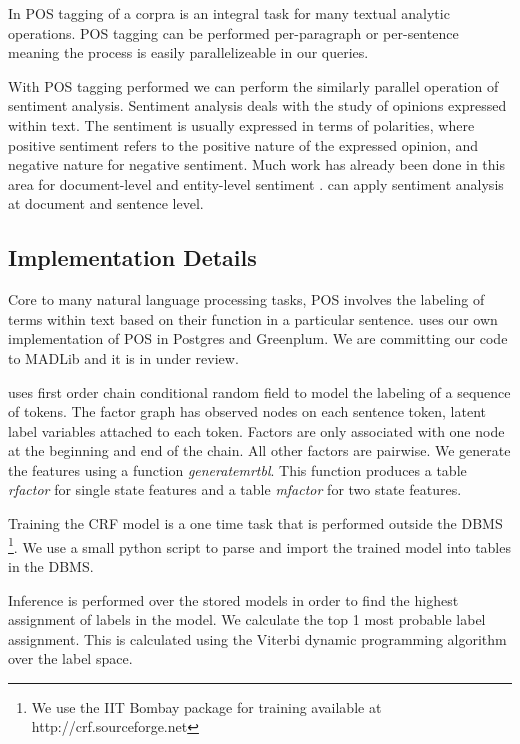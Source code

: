 In POS tagging of a corpra is an integral task for many 
textual analytic operations. POS tagging can be performed per-paragraph or 
per-sentence meaning the process is easily parallelizeable in our queries.

With POS tagging performed we can perform the similarly parallel operation 
of sentiment analysis.
Sentiment analysis deals with the study of opinions expressed within text. 
The sentiment is usually expressed in terms of polarities, where positive
sentiment refers to the positive nature of the expressed opinion, and negative
nature for negative sentiment. Much work has already been done in this
area for document-level and entity-level sentiment \cite{o2010tweets,
zhang2011combining}. 
{\system} can apply sentiment analysis at document and sentence level.


\subsection{Implementation Details}
\label{sec:impdis}


Core to many natural language processing tasks, POS involves the
labeling of terms within text based on their function in a particular sentence.
\system uses our own implementation of POS in Postgres and Greenplum. We are
committing our code to MADLib and it is in under review.

\system uses first order chain conditional random field to model the labeling
of a sequence of tokens. The factor graph has observed nodes on each sentence
token, latent label variables attached to each token.
Factors are only associated with one node at the beginning and end of the chain.
All other factors are pairwise.  
We generate the features using a function \textit{generatemrtbl}. 
This function produces a table \textit{rfactor} for single state features and a 
table \textit{mfactor} for two state features.

Training the CRF model is a one time task that is performed outside the 
DBMS \footnote{We use the IIT Bombay package for training available at 
http://crf.sourceforge.net }.
We use a small python script to parse and import the trained model into 
tables in the DBMS. 

Inference is performed over the stored models in order to find the highest 
assignment of labels in the model.
We calculate the top 1 most probable label assignment. This is calculated using
the Viterbi dynamic programming algorithm over the label space.


